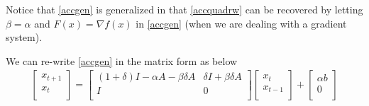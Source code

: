 Notice that \eqref{accgen} is generalized in that \eqref{accquadrw} can be recovered by letting $\beta=\alpha$ and $F(x)=\nabla f(x)$ in \eqref{accgen} (when we are dealing with a gradient system).
\par
We can re-write \eqref{accgen} in the matrix form as below
\begin{align}\label{accgenmat}
\begin{bmatrix} x_{t+1} \\ x_t\\\end{bmatrix}= \begin{bmatrix} (1+\delta)I-\alpha A-\beta\delta A & \delta I+\beta \delta A \\ I &0\\\end{bmatrix} \begin{bmatrix} x_{t} \\ x_{t-1}\\\end{bmatrix}+ \begin{bmatrix} \alpha b \\ 0\\\end{bmatrix}
\end{align}

